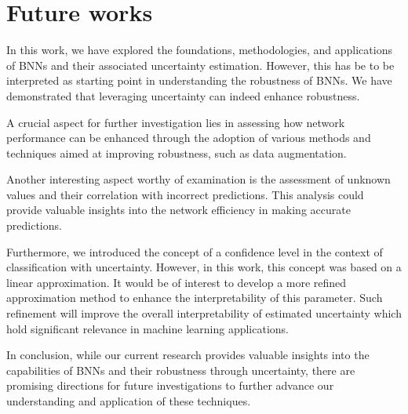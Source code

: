 \section{Future works}

In this work, we have explored the foundations, methodologies, and applications of BNNs and their associated uncertainty estimation. However, this has be to be interpreted as starting point in understanding the robustness of BNNs. We have demonstrated that leveraging uncertainty can indeed enhance robustness.

A crucial aspect for further investigation lies in assessing how network performance can be enhanced through the adoption of various methods and techniques aimed at improving robustness, such as data augmentation.

Another interesting aspect worthy of examination is the assessment of unknown values and their correlation with incorrect predictions. This analysis could provide valuable insights into the network efficiency in making accurate predictions.

Furthermore, we introduced the concept of a confidence level in the context of classification with uncertainty. However, in this work, this concept was based on a linear approximation. It would be of interest to develop a more refined approximation method to enhance the interpretability of this parameter. Such refinement will improve the overall interpretability of estimated uncertainty which hold significant relevance in machine learning applications.

In conclusion, while our current research provides valuable insights into the capabilities of BNNs and their robustness through uncertainty, there are promising directions for future investigations to further advance our understanding and application of these techniques.